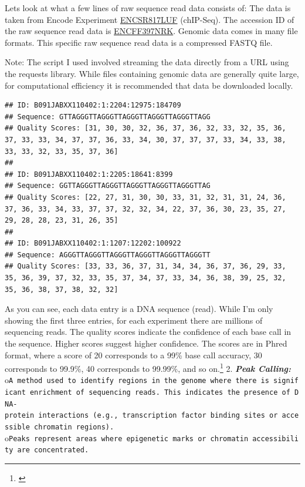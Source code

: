 \documentclass[
]{book}
\begin{document}
Lets look at what a few lines of raw sequence read data consists of:
The data is taken from Encode Experiment \href{https://www.encodeproject.org/experiments/ENCSR817LUF/}{ENCSR817LUF} (chIP-Seq). The accession ID of the raw sequence read data is \href{https://www.encodeproject.org/files/ENCFF397NRK/}{ENCFF397NRK}. Genomic data comes in many file formats. This specific raw sequence read data is a compressed FASTQ file.

Note: The script I used involved streaming the data directly from a URL using the requests library. While files containing genomic data are generally quite large, for computational efficiency it is recommended that data be downloaded locally.

\begin{verbatim}
## ID: B091JABXX110402:1:2204:12975:184709
## Sequence: GTTAGGGTTAGGGTTAGGGTTAGGGTTAGGGTTAGG
## Quality Scores: [31, 30, 30, 32, 36, 37, 36, 32, 33, 32, 35, 36, 37, 33, 33, 34, 37, 37, 36, 33, 34, 30, 37, 37, 37, 33, 34, 33, 38, 33, 33, 32, 33, 35, 37, 36]
## 
## ID: B091JABXX110402:1:2205:18641:8399
## Sequence: GGTTAGGGTTAGGGTTAGGGTTAGGGTTAGGGTTAG
## Quality Scores: [22, 27, 31, 30, 30, 33, 31, 32, 31, 31, 24, 36, 37, 36, 33, 34, 33, 37, 37, 32, 32, 34, 22, 37, 36, 30, 23, 35, 27, 29, 28, 28, 23, 31, 26, 35]
## 
## ID: B091JABXX110402:1:1207:12202:100922
## Sequence: AGGGTTAGGGTTAGGGTTAGGGTTAGGGTTAGGGTT
## Quality Scores: [33, 33, 36, 37, 31, 34, 34, 36, 37, 36, 29, 33, 35, 36, 39, 37, 32, 33, 35, 37, 34, 37, 33, 34, 36, 38, 39, 25, 32, 35, 36, 38, 37, 38, 32, 32]
\end{verbatim}

As you can see, each data entry is a DNA sequence (read). While I'm only showing the first three entries, for each experiment there are millions of sequencing reads. The quality scores indicate the confidence of each base call in the sequence. Higher scores suggest higher confidence. The scores are in Phred format, where a score of 20 corresponds to a 99\% base call accuracy, 30 corresponds to 99.9\%, 40 corresponds to 99.99\%, and so on.\footnote{\citet{green}}
2. \textbf{\emph{Peak Calling:}}
o\texttt{A\ method\ used\ to\ identify\ regions\ in\ the\ genome\ where\ there\ is\ significant\ enrichment\ of\ sequencing\ reads.\ This\ indicates\ the\ presence\ of\ DNA-protein\ interactions\ (e.g.,\ transcription\ factor\ binding\ sites\ or\ accessible\ chromatin\ regions).}
o\texttt{Peaks\ represent\ areas\ where\ epigenetic\ marks\ or\ chromatin\ accessibility\ are\ concentrated.}
\end{document}
